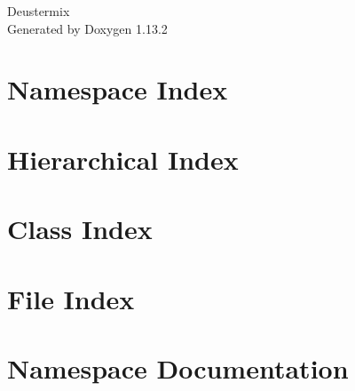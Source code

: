 \documentclass[twoside]{book}
\newcommand{\+}{\discretionary{\mbox{\scriptsize$\hookleftarrow$}}{}{}}
\newcommand{\clearemptydoublepage}{%
    \newpage{\pagestyle{empty}\cleardoublepage}%
  }
\begin{document}
  \raggedbottom
    \hypersetup{pageanchor=false,
                bookmarksnumbered=true,
                pdfencoding=unicode
               }
  \begin{titlepage}
  \vspace*{7cm}
  \begin{center}%
  {\Large Deustermix}\\
  \vspace*{1cm}
  {\large Generated by Doxygen 1.13.2}\\
  \end{center}
  \end{titlepage}
  \clearemptydoublepage
  \tableofcontents
  \clearemptydoublepage
  \hypersetup{pageanchor=true}

\chapter{Namespace Index}

\chapter{Hierarchical Index}

\chapter{Class Index}

\chapter{File Index}

\chapter{Namespace Documentation}












\end{document}
